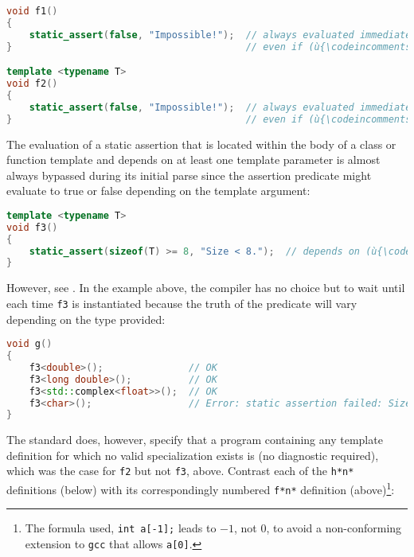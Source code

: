 \begin{lstlisting}[language=C++]
void f1()
{
    static_assert(false, "Impossible!");  // always evaluated immediately...
}                                         // even if (ù{\codeincomments{f1()}}ù) is never invoked

template <typename T>
void f2()
{
    static_assert(false, "Impossible!");  // always evaluated immediately...
}                                         // even if (ù{\codeincomments{f2()}}ù) is never instantiated
\end{lstlisting}

\noindent The evaluation of a static assertion that is located within the
body of a class or function template and depends on at least one
template parameter is almost always bypassed during its initial parse since
the assertion predicate might evaluate to true or false depending on the template argument:

\begin{lstlisting}[language=C++]
template <typename T>
void f3()
{
    static_assert(sizeof(T) >= 8, "Size < 8.");  // depends on (ù{\codeincomments{T}}ù)
}
\end{lstlisting}

\noindent However, see
.
In the example above, the compiler has no choice but to wait until each
time \lstinline!f3! is instantiated because the truth of the predicate will
vary depending on the type provided:

\begin{lstlisting}[language=C++]
void g()
{
    f3<double>();               // OK
    f3<long double>();          // OK
    f3<std::complex<float>>();  // OK
    f3<char>();                 // Error: static assertion failed: Size < 8.
}
\end{lstlisting}

\noindent The standard does, however, specify that a program containing any
template definition for which no valid specialization exists is
 (no diagnostic required), which was the case for
\lstinline!f2! but not \lstinline!f3!, above. Contrast each of the
\lstinline!h*!\lstinline[basicstyle=\ttfamily\itshape]!n!\lstinline!*! definitions (below) with its correspondingly numbered
\lstinline!f*!\lstinline[basicstyle=\ttfamily\itshape]!n!\lstinline!*!  definition (above)\footnote{The formula used, \lstinline!int!~\lstinline!a[-1];! leads to $-1$, not $0$, to avoid a non-conforming extension to \lstinline!gcc! that allows \lstinline!a[0]!.}:


